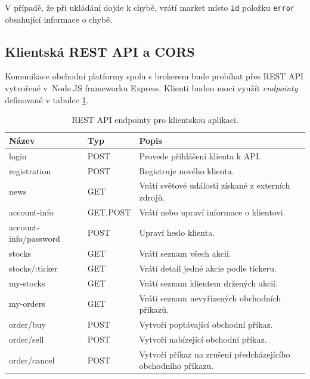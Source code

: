 \documentclass[thesis=M,czech]{FITthesis}[2012/06/26]
\begin{document}
	V případě, že při ukládání dojde k chybě, vrátí market místo \texttt{id} položku \texttt{error} obsahující informace o chybě.
	
\subsection{Klientská REST API a CORS}
\label{sec:broker_api}

	Komunikace obchodní platformy spolu s brokerem bude probíhat přes REST API vytvořené v~Node.JS frameworku Express. Klienti budou moci využít \textit{endpointy} definované v tabulce \ref{tab:broker_api_endpoints}.

\begin{table}[h]
	\begin{center}
		\def\arraystretch{1.5}%
		\begin{tabular}{|l|l|p{6cm}|}
		\hline
	    \textbf{Název} & \textbf{Typ}& \textbf{Popis} \\ \hline
		login & POST & Provede přihlášení klienta k API. \\ \hline
		registration & POST & Registruje nového klienta. \\ \hline
		news & GET & Vrátí světové události získané z externích zdrojů. \\ \hline
		account-info & GET,POST & Vrátí nebo upraví informace o klientovi. \\ \hline
		account-info/password & POST & Upraví heslo klienta. \\ \hline
		stocks & GET & Vrátí seznam všech akcií. \\ \hline
		stocks/:ticker & GET & Vrátí detail jedné akcie podle tickeru. \\ \hline
		my-stocks & GET & Vrátí seznam klientem držených akcií. \\ \hline
		my-orders & GET & Vrátí seznam nevyřízených obchodních příkazů. \\ \hline
		order/buy & POST & Vytvoří poptávající obchodní příkaz. \\ \hline
		order/sell & POST & Vytvoří nabízející obchodní příkaz. \\ \hline
		order/cancel & POST & Vytvoří příkaz na zrušení předcházejícího obchodního příkazu. \\ \hline
		\end{tabular}
	    \caption{REST API endpointy pro klientskou aplikaci.} 
	 	\label{tab:broker_api_endpoints}
	\end{center}
\end{table}
\end{document}
